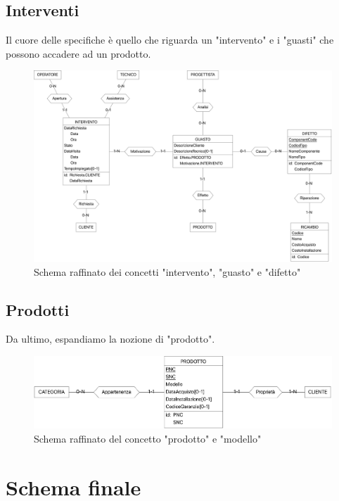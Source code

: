 \documentclass[a4paper, 12pt]{report}
\begin{document}
\subsection{Interventi}

Il cuore delle specifiche è quello che riguarda un "intervento" e i "guasti" che possono accadere ad un prodotto.

\begin{figure}[H]
	\centering
	\includegraphics[width=\linewidth]{images/interventi.png}
	\caption{Schema raffinato dei concetti "intervento", "guasto" e "difetto"}
\end{figure}

\subsection{Prodotti}

Da ultimo, espandiamo la nozione di "prodotto".

\begin{figure}[H]
	\centering
	\includegraphics[width=\linewidth]{images/prodotti.png}
	\caption{Schema raffinato del concetto "prodotto" e "modello"}
\end{figure}

\section{Schema finale}
\end{document}
